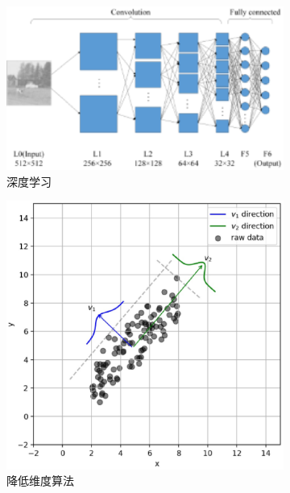 \begin{figure}[htp]
	 \medskip
	 \begin{subfigure}{.33\textwidth}
	   \centering
	   \includegraphics[width=\linewidth]{imgs/2.2.10.eps}
	   \caption{深度学习}
	   \label{fig:2.sub.10}
	 \end{subfigure}\hfil
	 \begin{subfigure}{.33\textwidth}
	   \centering
	   \includegraphics[width=\linewidth]{imgs/2.2.11.eps}
	   \caption{降低维度算法}
	   \label{fig:2.sub.11}
	 \end{subfigure}\hfil
	 \begin{subfigure}{.33\textwidth}
	   \centering

\end{subfigure}
\end{figure}
